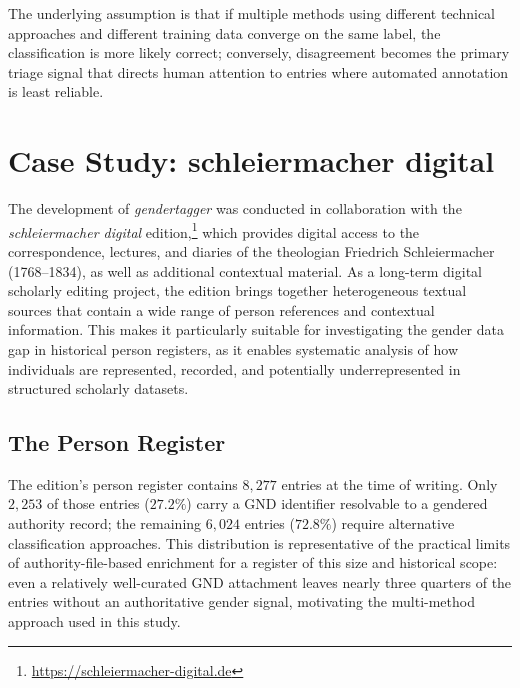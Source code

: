 \documentclass{eceasst}
\begin{document}
The underlying assumption is that if multiple methods using different technical approaches and different training data converge on the same label, the classification is more likely correct; conversely, disagreement becomes the primary triage signal that directs human attention to entries where automated annotation is least reliable.


\section{Case Study: schleiermacher digital}
\label{sec:case-study}

The development of \textit{gendertagger} was conducted in collaboration with the \textit{schleiermacher digital} edition,\footnote{\url{https://schleiermacher-digital.de}} which provides digital access to the correspondence, lectures, and diaries of the theologian Friedrich Schleiermacher (1768--1834), as well as additional contextual material. As a long-term digital scholarly editing project, the edition brings together heterogeneous textual sources that contain a wide range of person references and contextual information. This makes it particularly suitable for investigating the gender data gap in historical person registers, as it enables systematic analysis of how individuals are represented, recorded, and potentially underrepresented in structured scholarly datasets.

\subsection{The Person Register} The edition's person register contains $8{,}277$ entries at the time of writing. Only $2{,}253$ of those entries ($27.2\%$) carry a GND identifier resolvable to a gendered authority record; the remaining $6{,}024$ entries ($72.8\%$) require alternative classification approaches. This distribution is representative of the practical limits of authority-file-based enrichment for a register of this size and historical scope: even a relatively well-curated GND attachment leaves nearly three quarters of the entries without an authoritative gender signal, motivating the multi-method approach used in this study.
\end{document}

